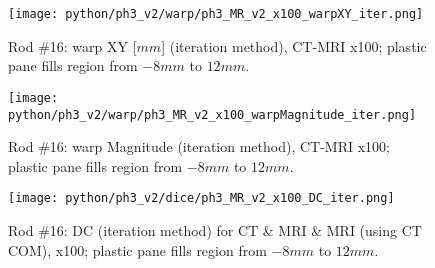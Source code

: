 \begin{figure}[!hbt]
  \centering
  \texttt{[image: python/ph3\_v2/warp/ph3\_MR\_v2\_x100\_warpXY\_iter.png]}
  \caption[Rod \#16: warp XY (iteration method), CT-MRI x100.]{Rod \#16: warp XY [$mm$] (iteration method), CT-MRI x100; plastic pane fills region from $-8mm$ to $12mm$.}
  \label{fig:ph3_warpXY_x100}
\end{figure}

\begin{figure}[!htb]
    \centering
    \texttt{[image: python/ph3\_v2/warp/ph3\_MR\_v2\_x100\_warpMagnitude\_iter.png]}
    \caption[Rod \#16: warp Magnitude (iteration method), CT-MRI x100.]{Rod \#16: warp Magnitude (iteration method), CT-MRI x100; plastic pane fills region from $-8mm$ to $12mm$.}
    \label{fig:ph3_warpMagnitude_x100}
\end{figure}

\begin{figure}[!htb]
     \centering
     \texttt{[image: python/ph3\_v2/dice/ph3\_MR\_v2\_x100\_DC\_iter.png]}
     \caption[Rod \#16: DC (iteration method) for CT \& MRI \& MRI (using CT COM), x100.]{Rod \#16: DC (iteration method) for CT \& MRI \& MRI (using CT COM), x100; plastic pane fills region from $-8mm$ to $12mm$.}
     \label{fig:ph3_DC_x100}
\end{figure}


\cleardoublepage